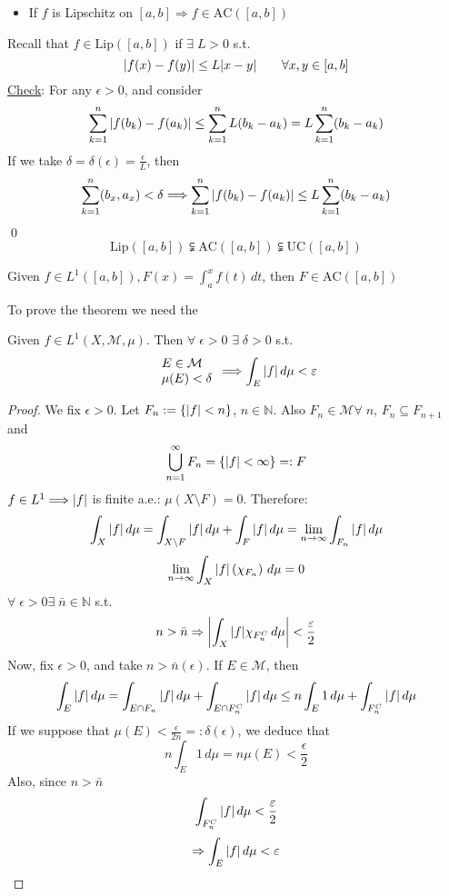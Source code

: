 \begin{itemize}
    \item If \(f\) is Lipschitz on \([a,b] \Longrightarrow f \in \text{AC}([a,b])\) 
\end{itemize}
Recall that \(f \in \mbox{Lip}([a,b])\) if \(\exists \; L > 0\) s.t. 
\[
    \abs{f(x) - f(y)} \leq L\abs{x-y} \qquad \forall x, y \in \left[a, b\right]
\]
\underline{Check}: For any \(\epsilon > 0\), and consider 
\[
    \sum_{k=1}^n \abs{f(b_k)-f(a_k)} \leq \sum_{k=1}^n L(b_k-a_k) = L \sum_{k=1}^n (b_k-a_k)
\]
If we take \(\delta = \delta(\epsilon) = \frac{\epsilon}{L}\), then 
\[
    \sum_{k=1}^n (b_x, a_x) < \delta \Longrightarrow \sum_{k=1}^n \abs{f(b_k)-f(a_k) } \leq L \sum_{k=1}^n (b_k-a_k)
\]
\qed
\[
    \mbox{Lip}([a,b]) \subsetneqq \mbox{AC}([a,b]) \subsetneqq \mbox{UC}([a,b])
\]
\begin{theorem}
    Given \(f \in L^1([a,b]), F(x) = \int_a^xf(t) \, dt\), then \(F \in \mbox{AC}([a,b])\)
\end{theorem}
To prove the theorem we need the
\begin{theorem}
    Given \(f \in L^1(X, \mathcal{M}, \mu)\). Then \(\forall \; \epsilon >0 \) \(\exists \; \delta > 0\) s.t.     
    \[
        \begin{array}{l}
            E \in \mathcal{M} \\
            \mu(E) < \delta
        \end{array} 
        \Longrightarrow \int_E \abs{f} \, d\mu < \varepsilon
    \]
\end{theorem}
\begin{proof}
    We fix \(\epsilon > 0\). Let \(F_n := \left\{ \abs{f} < n \right\}\), \(n \in \mathbb{N}\). Also \(F_n \in \mathcal{M} \forall \; n\), \(F_n \subseteq F_{n+1}\) and 
    \[
        \bigcup_{n=1}^{\infty} F_n = \left\{ \abs{f} < \infty \right\} =: F
    \]
    \(f \in L^1 \Longrightarrow \abs{f}\) is finite a.e.: \(\mu(X \setminus F) =0\).
    Therefore:
    \[
        \int_X \abs{f} \, d\mu = \int_{X \setminus F} \abs{f} \, d\mu + \int_F \abs{f} \, d\mu 
        = \lim_{n \to\infty} \int_{F_n} \abs{f} \, d\mu
    \]
    \[
        \lim_{n\to\infty} \int_X \abs{f} \left(\- \chi_{F_n} \right) \, d\mu =0
    \]
    \(\forall \; \epsilon >0 \exists \; \bar{n} \in \mathbb{N}\) s.t. 
    \[
        n > \bar{n} \Rightarrow \abs{\int_X \abs{f} \chi_{F_n^C} \, d\mu} < \frac{\varepsilon}{2}
    \]
    Now, fix \(\epsilon >0 \), and take \(n > \bar{n}(\epsilon)\). If \(E \in \mathcal{M}\), then
    \[
        \int_E \abs{f} \, d\mu = \int_{E \cap F_n} \abs{f} \, d\mu + \int_{E \cap F_n^C} \abs{f} \, d\mu
        \leq n \int_E 1 \, d\mu + \int_{F_n^C} \abs{f} \, d\mu 
    \]
    If we suppose that \(\mu(E) < \frac{\epsilon}{2n} =: \delta(\epsilon)\), we deduce that
    \[
        n \int_E 1 \, d\mu = n \mu(E) < \frac{\epsilon}{2}
    \]
    Also, since \(n > \bar{n}\)
    \[
        \int_{F_n^C} \abs{f} \, d\mu < \frac{\varepsilon}{2}
    \]
    \[
        \Rightarrow \int_E \abs{f} \, d\mu < \varepsilon \]
\end{proof}
